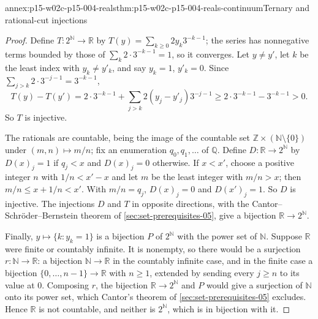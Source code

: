 \begin{annexitem}{annex:p15-w02c-p15-004-reals}{thm:p15-w02c-p15-004-reals-continuum}{Ternary and rational-cut injections}
\begin{proof}
Define \(T:2^{\mathbb N}\to\mathbb R\) by
\(T(y)=\sum_{k\geq0}2y_k3^{-k-1}\); the series has nonnegative terms
bounded by those of \(\sum_k2\cdot3^{-k-1}=1\), so it converges. Let
\(y\neq y'\), let \(k\) be the least index with \(y_k\neq y'_k\), and
say \(y_k=1\), \(y'_k=0\). Since
\(\sum_{j>k}2\cdot3^{-j-1}=3^{-k-1}\),
\[
 T(y)-T(y')=2\cdot3^{-k-1}+\sum_{j>k}2(y_j-y'_j)3^{-j-1}
           \geq2\cdot3^{-k-1}-3^{-k-1}>0 .
\]
So \(T\) is injective.

The rationals are countable, being the image of the countable set
\(\mathbb Z\times(\mathbb N\setminus\{0\})\) under \((m,n)\mapsto m/n\);
fix an enumeration \(q_0,q_1,\ldots\) of \(\mathbb Q\). Define
\(D:\mathbb R\to2^{\mathbb N}\) by \(D(x)_j=1\) if \(q_j<x\) and
\(D(x)_j=0\) otherwise. If \(x<x'\), choose a positive integer \(n\) with
\(1/n<x'-x\) and let \(m\) be the least integer with \(m/n>x\); then
\(m/n\leq x+1/n<x'\). With \(m/n=q_j\), \(D(x)_j=0\) and
\(D(x')_j=1\). So \(D\) is injective. The injections \(D\) and \(T\)
in opposite directions, with the Cantor--Schr\"oder--Bernstein theorem
of \cref{sec:set-prerequisites-05}, give a bijection
\(\mathbb R\to2^{\mathbb N}\).

Finally, \(y\mapsto\{k:y_k=1\}\) is a bijection \(P\) of
\(2^{\mathbb N}\) with the power set of \(\mathbb N\). Suppose
\(\mathbb R\) were finite or countably infinite. It is nonempty, so there
would be a surjection \(r:\mathbb N\to\mathbb R\): a bijection
\(\mathbb N\to\mathbb R\) in the countably infinite case, and in the
finite case a bijection \(\{0,\ldots,n-1\}\to\mathbb R\) with \(n\geq1\),
extended by sending every \(j\geq n\) to its value at \(0\). Composing
\(r\), the bijection \(\mathbb R\to2^{\mathbb N}\) and \(P\) would give a
surjection of \(\mathbb N\) onto its power set, which Cantor's theorem of
\cref{sec:set-prerequisites-05} excludes. Hence \(\mathbb R\) is not
countable, and neither is \(2^{\mathbb N}\), which is in bijection with
it.
\end{proof}
\end{annexitem}

